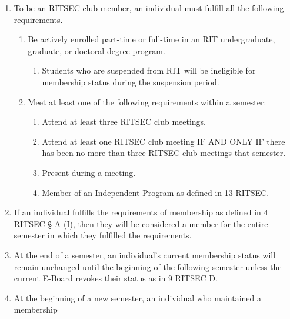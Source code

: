 


\begin{enumerate}
	\item To be an RITSEC club member, an individual must fulfill all the following
	      requirements.
	      \begin{enumerate}
		      \item Be actively enrolled part-time or full-time in an RIT undergraduate, graduate,
		            or doctoral degree program.
		            \begin{enumerate}
			            \item Students who are suspended from RIT will be ineligible for membership status
			                  during the suspension period.
		            \end{enumerate}
		      \item Meet at least one of the following requirements within a semester:
		            \begin{enumerate}
			            \item Attend at least three RITSEC club meetings.
			            \item Attend at least one RITSEC club meeting IF AND ONLY IF there has been no more
			                  than three RITSEC club meetings that semester.
			            \item Present during a meeting.
			            \item Member of an Independent Program as defined in 13 RITSEC\@.
		            \end{enumerate}
	      \end{enumerate}
	\item If an individual fulfills the requirements of membership as defined in 4 RITSEC
	      § A (I), then they will be considered a member for the entire semester in which
	      they fulfilled the requirements.
	\item At the end of a semester, an individual's current membership status will remain
	      unchanged until the beginning of the following semester unless the current
	      E-Board revokes their status as in 9 RITSEC D.
	\item At the beginning of a new semester, an individual who maintained a membership

\end{enumerate}
